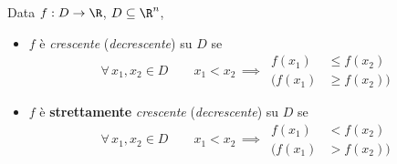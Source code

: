 Data $ f:D\to \R $, $ D \subseteq \R^{n} $, 
\begin{itemize}
\item $ f $ è \textit{crescente} (\textit{decrescente}) su $D $ se \begin{equation}
    \forall\, x_1, x_2 \in D\qquad x_1<x_2 \,\implies\, \begin{aligned}
        f(x_1)&\le f(x_2)\\
        \bigl(f(x_1)&\ge f(x_2)\bigr)
    \end{aligned}
\end{equation}
\item $ f $ è \textbf{strettamente} \textit{crescente} (\textit{decrescente}) su $D $ se \begin{equation}
    \forall\, x_1, x_2 \in D\qquad x_1<x_2 \,\implies\, \begin{aligned}
        f(x_1)&< f(x_2)\\
        \bigl(f(x_1)&> f(x_2)\bigr)
    \end{aligned}\end{equation}
\end{itemize}